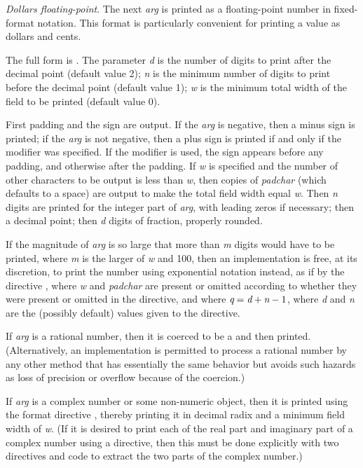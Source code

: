 \begin{flushdesc}
\item[\cd{{\Xtilde}\$}]
\emph{Dollars floating-point}.  The next \emph{arg} is printed as a floating-point
number in fixed-format notation.  This format is particularly
convenient for printing a value as dollars and cents.

The full form is .
The parameter \emph{d} is the number
of digits to print after the decimal point (default value 2);
\emph{n} is the minimum number of digits to print before the decimal
point (default value 1);
\emph{w} is the minimum total width of the field to be printed (default
value 0).

First padding and the sign are output.
If the \emph{arg} is negative, then a minus sign is printed;
if the \emph{arg} is not negative, then a plus sign is printed
if and only if the \cd{{\Xatsign}} modifier was specified.  
If the \cd{:} modifier is used, the sign appears before any padding,
and otherwise after the padding.
If \emph{w} is specified and the number of other characters to be output
is less than \emph{w}, then copies of \emph{padchar} (which defaults
to a space) are output to
make the total field width equal \emph{w}.
Then \emph{n} digits are printed for the integer part of \emph{arg},
with leading zeros if necessary; then a decimal point;
then \emph{d} digits of fraction, properly rounded.

If the magnitude of \emph{arg} is so large that more than \emph{m} digits would
have to be printed, where \emph{m} is the larger of \emph{w} and 100, then an
implementation is free, at its discretion, to print the number using
exponential notation instead, as if by the directive
, where \emph{w} and \emph{padchar} are
present or omitted according to whether they were present or omitted in
the \cd{{\Xtilde}\$} directive, and where $\emph{q}=\emph{d}+\emph{n}-1$,
where \emph{d} and \emph{n} are the (possibly default) values given to the
\cd{{\Xtilde}\$} directive.

If \emph{arg} is a rational number, then it is coerced to be a 
and then printed.  (Alternatively, an implementation is permitted to
process a rational number by any other method that has essentially the
same behavior but avoids such hazards as loss of precision or overflow
because of the coercion.)

If \emph{arg} is a complex number or some non-numeric
object, then it is printed using the format directive ,
thereby printing it in decimal radix and a minimum field width of \emph{w}.
(If it is desired to print each of the real part and imaginary part
of a complex number using a \cd{{\Xtilde}\$} directive, then this must
be done explicitly with two \cd{{\Xtilde}\$} directives and code to
extract the two parts of the complex number.)


\end{flushdesc}
